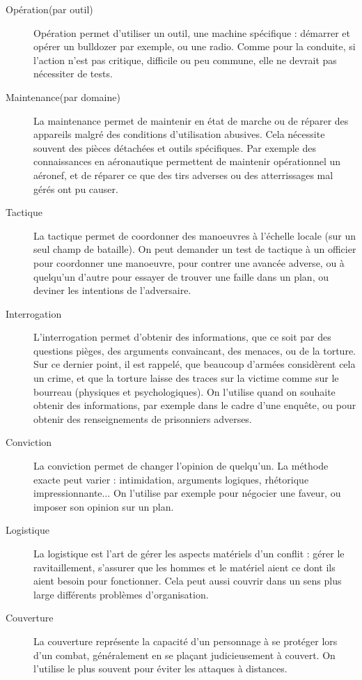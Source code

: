 \documentclass{report}
\begin{document}
\begin{multicols}{2}
\begin{description}
    \item[Opération(par outil)] Opération permet d'utiliser un outil, une machine spécifique : démarrer et opérer un bulldozer par exemple, ou une radio. Comme pour la conduite, si l'action n'est pas critique, difficile ou peu commune, elle ne devrait pas nécessiter de tests.
    \item[Maintenance(par domaine)]La maintenance permet de maintenir en état de marche ou de réparer des appareils malgré des conditions d'utilisation abusives. Cela nécessite souvent des pièces détachées et outils spécifiques. Par exemple des connaissances en aéronautique permettent de maintenir opérationnel un aéronef, et de réparer ce que des tirs adverses ou des atterrissages mal gérés ont pu causer.
    \item[Tactique]La tactique permet de coordonner des manoeuvres à l'échelle locale (sur un seul champ de bataille). On peut demander un test de tactique à un officier pour coordonner une manoeuvre, pour contrer une avancée adverse, ou à quelqu'un d'autre pour essayer de trouver une faille dans un plan, ou deviner les intentions de l'adversaire.
    \item[Interrogation] L'interrogation permet d'obtenir des informations, que ce soit par des questions pièges, des arguments convaincant, des menaces, ou de la torture. Sur ce dernier point, il est rappelé, que beaucoup d'armées considèrent cela un crime, et que la torture laisse des traces sur la victime comme sur le bourreau (physiques et psychologiques). On l'utilise quand on souhaite obtenir des informations, par exemple dans le cadre d'une enquête, ou pour obtenir des renseignements de prisonniers adverses.
    \item[Conviction] La conviction permet de changer l'opinion de quelqu'un. La méthode exacte peut varier : intimidation, arguments logiques, rhétorique impressionnante... On l'utilise par exemple pour négocier une faveur, ou imposer son opinion sur un plan.
    \item[Logistique] La logistique est l'art de gérer les aspects matériels d'un conflit : gérer le ravitaillement, s'assurer que les hommes et le matériel aient ce dont ils aient besoin pour fonctionner. Cela peut aussi couvrir dans un sens plus large différents problèmes d'organisation.
    \item[Couverture] La couverture représente la capacité d'un personnage à se protéger lors d'un combat, généralement en se plaçant judicieusement à couvert. On l'utilise le plus souvent pour éviter les attaques à distances.

\end{description}
\end{multicols}
\end{document}
